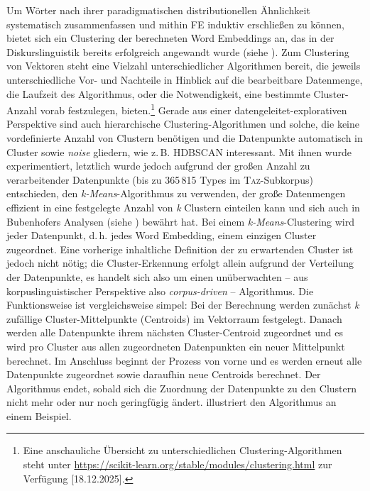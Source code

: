 \label{clustering-von-word-embeddings}
\largerpage
Um Wörter nach ihrer paradigmatischen distributionellen Ähnlichkeit systematisch zusammenfassen und mithin FE induktiv erschließen zu können, bietet sich ein Clustering der berechneten Word Embeddings an, das in der Diskurslinguistik bereits erfolgreich angewandt wurde (siehe ). Zum Clustering von Vektoren steht eine Vielzahl unterschiedlicher Algorithmen bereit, die jeweils unterschiedliche Vor- und Nachteile in Hinblick auf die bearbeitbare Datenmenge, die Laufzeit des Algorithmus, oder die Notwendigkeit, eine bestimmte Cluster-Anzahl vorab festzulegen, bieten.\footnote{Eine anschauliche Übersicht zu unterschiedlichen Clustering-Algorithmen steht unter \url{https://scikit-learn.org/stable/modules/clustering.html} zur Verfügung {[}18.12.2025{]}.} Gerade aus einer datengeleitet-explorativen Perspektive sind auch hierarchische Clustering-Algorithmen und solche, die keine vordefinierte Anzahl von Clustern benötigen und die Datenpunkte automatisch in Cluster sowie \emph{noise} gliedern, wie z.\,B. HDBSCAN \autocite{campelloDensityBasedClusteringBased2013} interessant. Mit ihnen wurde experimentiert, letztlich wurde jedoch aufgrund der großen Anzahl zu verarbeitender Datenpunkte (bis zu 365\,815 Types im \textsc{Taz}-Subkorpus) entschieden, den \emph{k-Means}-Algorithmus \autocite{macqueenMethodsClassificationAnalysis1967} zu verwenden, der große Datenmengen effizient in eine festgelegte Anzahl von \emph{k} Clustern einteilen kann und sich auch in Bubenhofers Analysen (siehe ) bewährt hat. Bei einem \emph{k-Means}-Clustering wird jeder Datenpunkt, d.\,h. jedes Word Embedding, einem einzigen Cluster zugeordnet. Eine vorherige inhaltliche Definition der zu erwartenden Cluster ist jedoch nicht nötig; die Cluster-Erkennung erfolgt allein aufgrund der Verteilung der Datenpunkte, es handelt sich also um einen unüberwachten -- aus korpuslinguistischer Perspektive also \emph{corpus-driven} -- Algorithmus. Die Funktionsweise ist vergleichsweise simpel: Bei der Berechnung werden zunächst \emph{k} zufällige Cluster-Mittelpunkte (Centroids) im Vektorraum festgelegt. Danach werden alle Datenpunkte ihrem nächsten Cluster-Centroid zugeordnet und es wird pro Cluster aus allen zugeordneten Datenpunkten ein neuer Mittelpunkt berechnet. Im Anschluss beginnt der Prozess von vorne und es werden erneut alle Datenpunkte zugeordnet sowie daraufhin neue Centroids berechnet. Der Algorithmus endet, sobald sich die Zuordnung der Datenpunkte zu den Clustern nicht mehr oder nur noch geringfügig ändert.  illustriert den Algorithmus an einem Beispiel.

